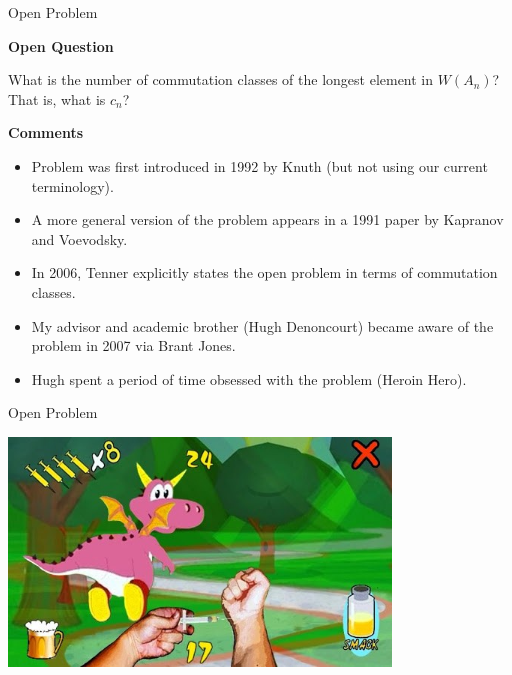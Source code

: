\documentclass[10pt, compress,aspectratio=169,handout]{beamer}
\begin{document}

\begin{frame}{Open Problem}\pause

\vspace{1em}

\begin{block}{\textbf{Open Question}}

\vspace{-.5em}
What is the number of commutation classes of the longest element in $W(A_n)$? That is, what is $c_n$?
\end{block}

\pause

\begin{block}{\textbf{Comments}}
\vspace{-.5em}

\begin{itemize}
\item Problem was first introduced in 1992 by Knuth (but not using our current terminology). \pause
\item A more general version of the problem appears in a 1991 paper by Kapranov and Voevodsky. \pause
\item In 2006, Tenner explicitly states the open problem in terms of commutation classes. \pause
\item My advisor and academic brother (Hugh Denoncourt) became aware of the problem in 2007 via Brant Jones. \pause
\item Hugh spent a period of time obsessed with the problem (\alert{Heroin Hero}). 
\end{itemize}
\end{block}

\end{frame}


\begin{frame}{Open Problem}

\vspace{1em}

\begin{center}
\includegraphics[width=4in]{HeroinHero.jpg}
\end{center}

\end{frame}
\end{document}
